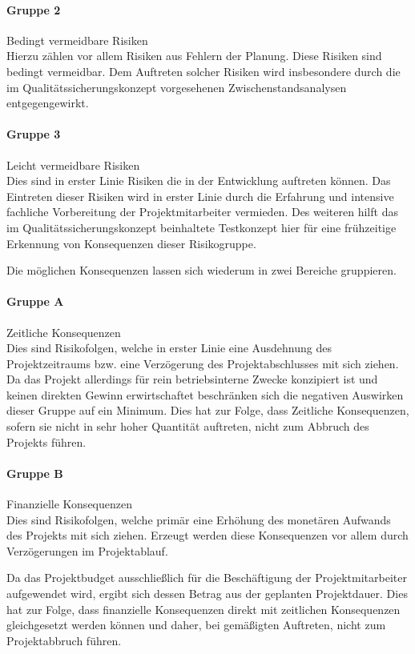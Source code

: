 \documentclass[12pt, xcolor=dvipsnames]{scrartcl}
\begin{document}
\paragraph{Gruppe 2}
Bedingt vermeidbare Risiken \\
Hierzu zählen vor allem Risiken aus Fehlern der Planung. Diese Risiken sind bedingt vermeidbar. Dem Auftreten solcher Risiken wird insbesondere durch die im  Qualitätssicherungskonzept vorgesehenen Zwischenstandsanalysen entgegengewirkt.

\paragraph{Gruppe 3}
Leicht vermeidbare Risiken \\
Dies sind in erster Linie Risiken die in der Entwicklung auftreten können. Das Eintreten dieser Risiken wird in erster Linie durch die Erfahrung und intensive fachliche Vorbereitung der Projektmitarbeiter vermieden. Des weiteren hilft das im Qualitätssicherungskonzept beinhaltete Testkonzept hier für eine frühzeitige Erkennung von Konsequenzen dieser Risikogruppe.


Die möglichen Konsequenzen lassen sich wiederum in zwei Bereiche gruppieren.

\paragraph{Gruppe A} Zeitliche Konsequenzen \\
Dies sind Risikofolgen, welche in erster Linie eine Ausdehnung des Projektzeitraums bzw. eine Verzögerung des Projektabschlusses mit sich ziehen. Da das Projekt allerdings für rein betriebsinterne Zwecke konzipiert ist und keinen direkten Gewinn erwirtschaftet beschränken sich die negativen Auswirken dieser Gruppe auf ein Minimum. Dies hat zur Folge, dass Zeitliche Konsequenzen, sofern sie nicht in sehr hoher Quantität auftreten, nicht zum Abbruch des Projekts führen.

\paragraph{Gruppe B} Finanzielle Konsequenzen \\
Dies sind Risikofolgen, welche primär eine Erhöhung des monetären Aufwands des Projekts mit sich ziehen. Erzeugt werden diese Konsequenzen vor allem durch Verzögerungen im Projektablauf.

Da das Projektbudget ausschließlich für die Beschäftigung der Projektmitarbeiter aufgewendet wird, ergibt sich dessen Betrag aus der geplanten Projektdauer. Dies hat zur Folge, dass finanzielle Konsequenzen direkt mit zeitlichen Konsequenzen gleichgesetzt werden können und daher, bei gemäßigten Auftreten, nicht zum Projektabbruch führen.
\end{document}
